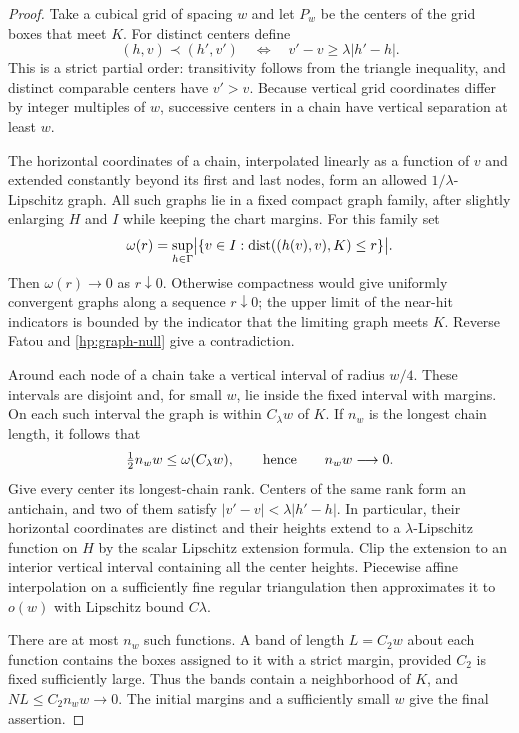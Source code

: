\begin{proof}
Take a cubical grid of spacing $w$ and let $P_w$ be the centers of
the grid boxes that meet $K$.  For distinct centers define
\[
 (h,v)\prec(h',v')\quad\Longleftrightarrow\quad
                         v'-v\ge\lambda|h'-h|.
\]
This is a strict partial order: transitivity follows from the
triangle inequality, and distinct comparable centers have $v'>v$.
Because vertical grid coordinates differ by integer multiples of
$w$, successive centers in a chain have vertical separation at least
$w$.

The horizontal coordinates of a chain, interpolated linearly as a
function of $v$ and extended constantly beyond its first and last
nodes, form an allowed $1/\lambda$-Lipschitz graph.  All such graphs
lie in a fixed compact graph family, after slightly enlarging $H$
and $I$ while keeping the chart margins.  For this family set
\[
 \omega(r)=\sup_{h\in\Gamma}
  \bigl|\{v\in I:\operatorname{dist}((h(v),v),K)\le r\}\bigr|.
\]
Then $\omega(r)\to0$ as $r\downarrow0$.  Otherwise compactness
would give uniformly convergent graphs along a sequence $r\downarrow0$;
the upper limit of the near-hit indicators is bounded by the
indicator that the limiting graph meets $K$.  Reverse Fatou and
\eqref{hp:graph-null} give a contradiction.

Around each node of a chain take a vertical interval of radius
$w/4$.  These intervals are disjoint and, for small $w$, lie inside
the fixed interval with margins.  On each such interval the graph
is within $C_\lambda w$ of $K$.  If $n_w$ is the longest chain
length, it follows that
\[
 \tfrac12 n_ww\le\omega(C_\lambda w),
 \qquad\hbox{hence}\qquad n_ww\longrightarrow0.
\]
Give every center its longest-chain rank.  Centers of the same rank
form an antichain, and two of them satisfy
$|v'-v|<\lambda|h'-h|$.  In particular, their horizontal coordinates
are distinct and their heights extend to a $\lambda$-Lipschitz
function on $H$ by the scalar Lipschitz extension formula.  Clip
the extension to an interior vertical interval containing all the
center heights.  Piecewise affine interpolation on a sufficiently
fine regular triangulation then approximates it to $o(w)$ with
Lipschitz bound $C\lambda$.

There are at most $n_w$ such functions.  A band of length $L=C_2w$
about each function contains the boxes assigned to it with a strict
margin, provided $C_2$ is fixed sufficiently large.  Thus the bands
contain a neighborhood of $K$, and
$NL\le C_2n_ww\to0$.  The initial margins and a sufficiently small
$w$ give the final assertion.
\end{proof}

